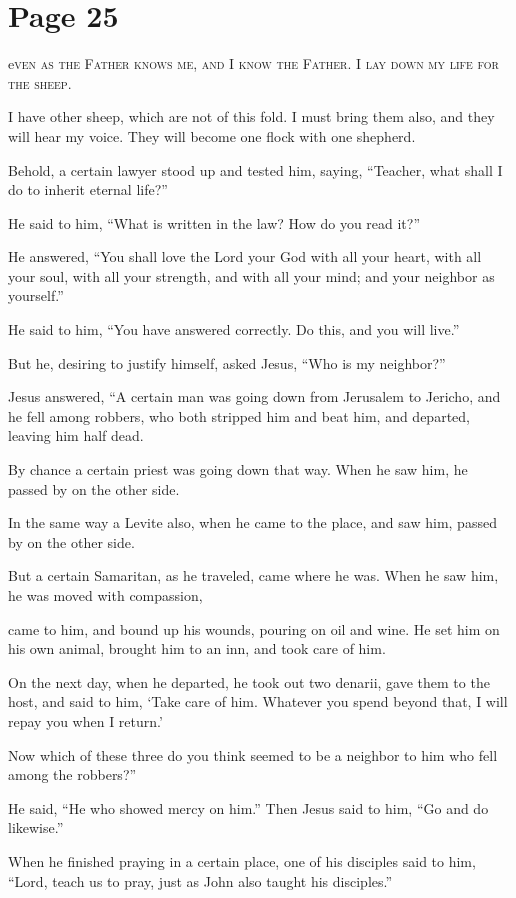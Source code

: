 \chapterornament
\section*{Page 25}

\lettrine{e}{ven as the Father knows me, and I know the Father. I lay down my life for the sheep.}

I have other sheep, which are not of this fold. I must bring them also, and they will hear my voice. They will become one flock with one shepherd.

Behold, a certain lawyer stood up and tested him, saying, “Teacher, what shall I do to inherit eternal life?”

He said to him, “What is written in the law? How do you read it?”

He answered, “You shall love the Lord your God with all your heart, with all your soul, with all your strength, and with all your mind; and your neighbor as yourself.”

He said to him, “You have answered correctly. Do this, and you will live.”

But he, desiring to justify himself, asked Jesus, “Who is my neighbor?”

Jesus answered, “A certain man was going down from Jerusalem to Jericho, and he fell among robbers, who both stripped him and beat him, and departed, leaving him half dead.

By chance a certain priest was going down that way. When he saw him, he passed by on the other side.

In the same way a Levite also, when he came to the place, and saw him, passed by on the other side.

But a certain Samaritan, as he traveled, came where he was. When he saw him, he was moved with compassion,

came to him, and bound up his wounds, pouring on oil and wine. He set him on his own animal, brought him to an inn, and took care of him.

On the next day, when he departed, he took out two denarii, gave them to the host, and said to him, ‘Take care of him. Whatever you spend beyond that, I will repay you when I return.’

Now which of these three do you think seemed to be a neighbor to him who fell among the robbers?”

He said, “He who showed mercy on him.” Then Jesus said to him, “Go and do likewise.”

When he finished praying in a certain place, one of his disciples said to him, “Lord, teach us to pray, just as John also taught his disciples.”

